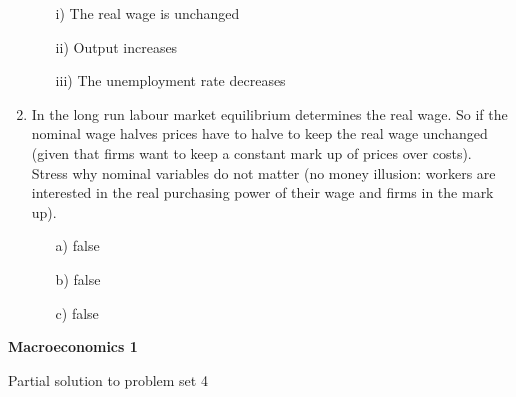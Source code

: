 \documentclass[12pt,a4paper]{article}
\begin{document}
\begin{enumerate}
\begin{enumerate}
    i) The real wage is unchanged

    ii) Output increases

    iii) The unemployment rate decreases
  \end{enumerate}

\item In the long run labour market equilibrium determines the real
  wage.  So if the nominal wage halves prices have to halve to keep the
  real wage unchanged (given that firms want to keep a constant mark up
  of prices over costs). Stress why nominal variables do not matter (no
  money illusion: workers are interested in the real purchasing power of
  their wage and firms in the mark up).

  \begin{enumerate}
  \item [a)]false

  \item[b)] false

  \item[c)] false
  \end{enumerate}

\end{enumerate}
 \newpage
 \begin{center}
  \textbf{Macroeconomics 1}

  Partial solution to problem set 4
\end{center}
\end{document}
